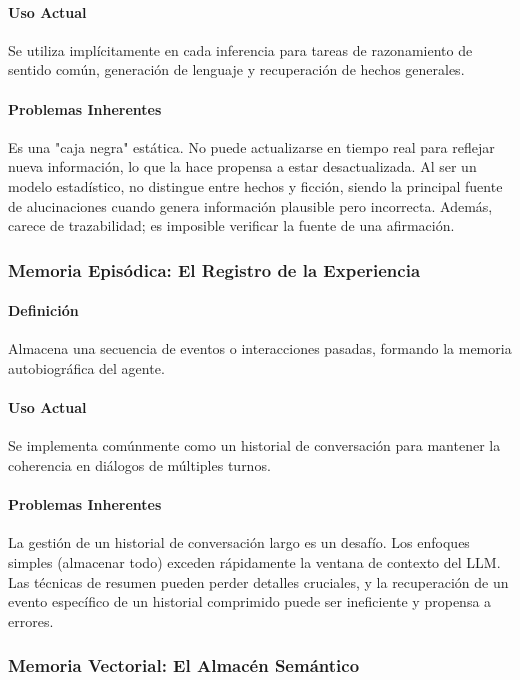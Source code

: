 \documentclass[conference]{IEEEtran}
\begin{document}
\paragraph{Uso Actual} Se utiliza implícitamente en cada inferencia para tareas de razonamiento de sentido común, generación de lenguaje y recuperación de hechos generales.

\paragraph{Problemas Inherentes} Es una "caja negra" estática. No puede actualizarse en tiempo real para reflejar nueva información, lo que la hace propensa a estar desactualizada. Al ser un modelo estadístico, no distingue entre hechos y ficción, siendo la principal fuente de alucinaciones cuando genera información plausible pero incorrecta. Además, carece de trazabilidad; es imposible verificar la fuente de una afirmación.

\subsubsection{Memoria Episódica: El Registro de la Experiencia}
\paragraph{Definición} Almacena una secuencia de eventos o interacciones pasadas, formando la memoria autobiográfica del agente.

\paragraph{Uso Actual} Se implementa comúnmente como un historial de conversación para mantener la coherencia en diálogos de múltiples turnos.

\paragraph{Problemas Inherentes} La gestión de un historial de conversación largo es un desafío. Los enfoques simples (almacenar todo) exceden rápidamente la ventana de contexto del LLM. Las técnicas de resumen pueden perder detalles cruciales, y la recuperación de un evento específico de un historial comprimido puede ser ineficiente y propensa a errores.

\subsubsection{Memoria Vectorial: El Almacén Semántico}
\end{document}
